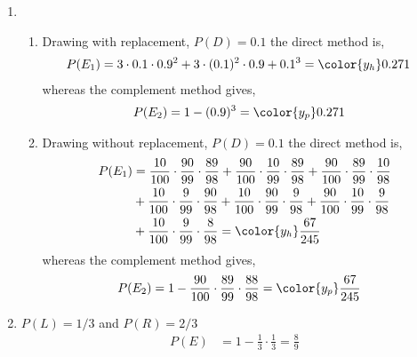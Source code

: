 \begin{enumerate}
    \item \begin{enumerate}
              \item Drawing with replacement, $ P(D) = 0.1 $ the direct method is,
                    \begin{align}
                        P(E_1) & = 3 \cdot 0.1 \cdot 0.9^2 + 3 \cdot (0.1)^2 \cdot 0.9
                        + 0.1^3
                        = \color{y_h}0.271
                    \end{align}
                    whereas the complement method gives,
                    \begin{align}
                        P(E_2) & = 1 - (0.9)^3 = \color{y_p} 0.271
                    \end{align}
              \item Drawing without replacement, $ P(D) = 0.1 $ the direct method is,
                    \begin{align}
                        P(E_1) & = \frac{10}{100} \cdot \frac{90}{99} \cdot
                        \frac{89}{98}
                        + \frac{90}{100} \cdot \frac{10}{99} \cdot \frac{89}{98}
                        + \frac{90}{100} \cdot \frac{89}{99} \cdot \frac{10}{98} \\
                               & + \frac{10}{100} \cdot \frac{9}{99} \cdot
                        \frac{90}{98}
                        + \frac{10}{100} \cdot \frac{90}{99} \cdot \frac{9}{98}
                        + \frac{90}{100} \cdot \frac{10}{99} \cdot \frac{9}{98}  \\
                               & + \frac{10}{100} \cdot \frac{9}{99}
                        \cdot \frac{8}{98} = \color{y_h} \frac{67}{245}
                    \end{align}
                    whereas the complement method gives,
                    \begin{align}
                        P(E_2) & = 1 - \frac{90}{100} \cdot \frac{89}{99}
                        \cdot \frac{88}{98} = \color{y_p} \frac{67}{245}
                    \end{align}
          \end{enumerate}

    \item $ P(L) = 1/3 $ and $ P(R) = 2/3 $
          \begin{align}
              P(E) & = 1 - \frac{1}{3} \cdot \frac{1}{3} = \frac{8}{9}
          \end{align}


\end{enumerate}
